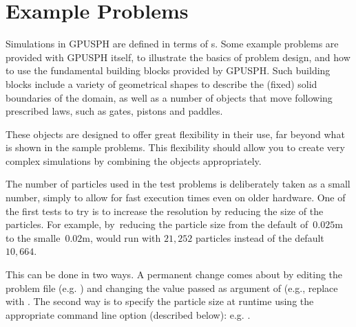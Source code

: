 \section{Example Problems}

Simulations in GPUSPH are defined in terms of s. Some
example problems are provided with GPUSPH itself, to illustrate the
basics of problem design, and how to use the fundamental building blocks
provided by GPUSPH. Such building blocks include a variety of
geometrical shapes to describe the (fixed) solid boundaries of the
domain, as well as a number of objects that move following prescribed
laws, such as gates, pistons and paddles.

These objects are designed to offer great flexibility in their use, far
beyond what is shown in the sample problems. This flexibility should
allow you to create very complex simulations by combining the objects
appropriately.

\iffalse
GPUSPH has options for specified moving objects, which are used to make
piston and paddle wavemakers and a moving gate. These objects are
comprised of particles that are distinguished by identifying their type
as GATEPART, PISTONPART, and PADDLEPART. (Water is distinguished by
FLUIDPART and fixed boundary particles are of type BOUNDPART.) The
distinction between GATEPART and PISTONPART is that the particles of the
GATE are moved by providing an arbitrary (possibly time-varying)
velocity vector in the problem's callback function and a PISTONPART
particle is moved by providing a displacement for the vertical piston in
(only the) x direction with time, again via the callback function.
\else
{}
\fi

The number of particles used in the test problems is deliberately taken
as a small number, simply to allow for fast execution times even on
older hardware. One of the first tests to try is to increase the
resolution by reducing the size of the particles. For example,
by~reducing the particle size from the default of~$0.025$m to the
smalle~$0.02$m,  would run with $21,252$ particles
instead of the default $10,664$.

This can be done in two ways. A permanent change comes about by editing
the problem file (e.g. ) and changing the value
passed as argument of  (e.g., replace
 with . The second way
is to specify the particle size at runtime using the appropriate command
line option (described below): e.g. .

